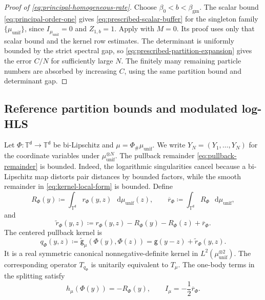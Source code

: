 \documentclass[11pt,reqno]{amsart}
\numberwithin{equation}{section}
\theoremstyle{plain}
\theoremstyle{definition}
\renewcommand{\d}{\mathsf d}
\newcommand{\dd}{\mathop{}\!\mathrm d}
\newcommand{\T}{\mathbb T}
\newcommand{\be}{\beta}
\newcommand{\g}{\mathsf g}
\newcommand{\tl}{\widetilde}
\newcommand{\muunif}{\mu_{\mathrm{unif}}}
\newcommand{\gm}{\mathrm{gm}}
\begin{document}
\begin{proof}[Proof of \eqref{eq:principal-homogeneous-rate}]
Choose $\be_0<b<\beta_{\gm}$. The scalar bound \eqref{eq:principal-order-one} gives \eqref{eq:prescribed-scalar-buffer} for the singleton family $\{\muunif\}$, since $I_{\muunif}=0$ and $Z_{1,b}=1$. Apply  with $M=0$. Its proof uses only that scalar bound and the kernel row estimates. The determinant is uniformly bounded by the strict spectral gap, so \eqref{eq:prescribed-partition-expansion} gives the error $C/N$ for sufficiently large $N$. The finitely many remaining particle numbers are absorbed by increasing $C$, using the same partition bound and determinant gap.
\end{proof}

\subsection{Reference partition bounds and modulated log-HLS}
\label{subsec:transported-references}

Let $\Phi:\T^{\d}\to\T^{\d}$ be bi-Lipschitz and $\mu=\Phi_{\#}\muunif$.  We write $Y_N=(Y_1,\ldots,Y_N)$ for the coordinate variables under $\muunif^{\otimes N}$.  The pullback remainder \eqref{eq:pullback-remainder} is bounded.  Indeed, the logarithmic singularities cancel because a bi-Lipschitz map distorts pair distances by bounded factors, while the smooth remainder in \eqref{eq:kernel-local-form} is bounded.  Define
\begin{equation}
 R_{\Phi}(y)\coloneqq\int_{\T^{\d}}r_{\Phi}(y,z)\,\dd\muunif(z),
 \qquad
 \overline r_{\Phi}\coloneqq\int_{\T^{\d}}R_{\Phi}\,\dd\muunif,
 \label{eq:transport-one-body-data}
\end{equation}
and
\begin{equation}
 \tl r_{\Phi}(y,z)
 \coloneqq r_{\Phi}(y,z)-R_{\Phi}(y)-R_{\Phi}(z)+\overline r_{\Phi}.
 \label{eq:transport-hoeffding-centering}
\end{equation}
The centered pullback kernel is
\begin{equation}
 q_{\Phi}(y,z)
 \coloneqq\tl{\g}_{\mu}(\Phi(y),\Phi(z))
 =\g(y-z)+\tl r_{\Phi}(y,z).
 \label{eq:centered-pullback-kernel}
\end{equation}
It is a real symmetric canonical nonnegative-definite kernel in $L^2(\muunif^{\otimes2})$.  The corresponding operator $T_{q_{\Phi}}$ is unitarily equivalent to $T_{\mu}$.
The one-body terms in the splitting satisfy
\begin{equation}
 h_\mu(\Phi(y))=-R_\Phi(y),
 \qquad
 I_{\mu}=-\frac12\overline r_\Phi.
 \label{eq:transport-potential-identities}
\end{equation}
\end{document}
